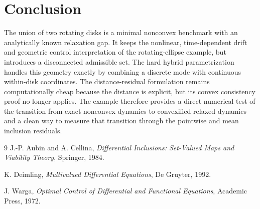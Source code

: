 \documentclass[11pt]{article}
\begin{document}
\section{Conclusion}

The union of two rotating disks is a minimal nonconvex benchmark with an analytically known relaxation gap. It keeps the nonlinear, time-dependent drift and geometric control interpretation of the rotating-ellipse example, but introduces a disconnected admissible set. The hard hybrid parametrization handles this geometry exactly by combining a discrete mode with continuous within-disk coordinates. The distance-residual formulation remains computationally cheap because the distance is explicit, but its convex consistency proof no longer applies. The example therefore provides a direct numerical test of the transition from exact nonconvex dynamics to convexified relaxed dynamics and a clean way to measure that transition through the pointwise and mean inclusion residuals.

\begin{thebibliography}{9}
J.-P. Aubin and A. Cellina,
\emph{Differential Inclusions: Set-Valued Maps and Viability Theory},
Springer, 1984.

K. Deimling,
\emph{Multivalued Differential Equations},
De Gruyter, 1992.

J. Warga,
\emph{Optimal Control of Differential and Functional Equations},
Academic Press, 1972.
\end{thebibliography}
\end{document}
